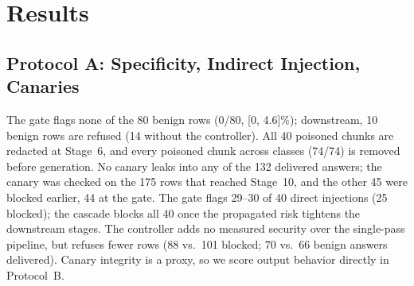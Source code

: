 \documentclass[conference,a4paper]{IEEEtran}
\begin{document}
\section{Results}\label{sec:results}
\subsection{Protocol A: Specificity, Indirect Injection, Canaries}
The gate flags none of the 80 benign rows (0/80, [0, 4.6]\%); downstream, 10 benign rows are refused (14 without the controller). All 40 poisoned chunks are redacted at Stage~6, and every poisoned chunk across classes (74/74) is removed before generation. No canary leaks into any of the 132 delivered answers; the canary was checked on the 175 rows that reached Stage~10, and the other 45 were blocked earlier, 44 at the gate. The gate flags 29--30 of 40 direct injections (25 blocked); the cascade blocks all 40 once the propagated risk tightens the downstream stages. The controller adds no measured security over the single-pass pipeline, but refuses fewer rows (88 vs.\ 101 blocked; 70 vs.\ 66 benign answers delivered). Canary integrity is a proxy, so we score output behavior directly in Protocol~B.
\end{document}
